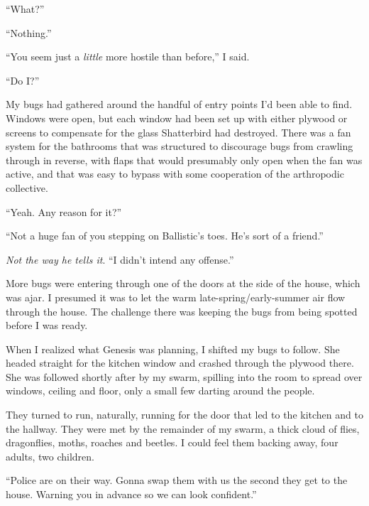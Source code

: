 ``What?''



``Nothing.''



``You seem just a \emph{little} more hostile than before,'' I said.



``Do I?''



My bugs had gathered around the handful of entry points I'd been able to find.  Windows were open, but each window had been set up with either plywood or screens to compensate for the glass Shatterbird had destroyed.  There was a fan system for the bathrooms that was structured to discourage bugs from crawling through in reverse, with flaps that would presumably only open when the fan was active, and that was easy to bypass with some cooperation of the arthropodic collective.



``Yeah.  Any reason for it?''



``Not a huge fan of you stepping on Ballistic's toes.  He's sort of a friend.''



\emph{Not the way he tells it}.  ``I didn't intend any offense.''



More bugs were entering through one of the doors at the side of the house, which was ajar.  I presumed it was to let the warm late-spring/early-summer air flow through the house.  The challenge there was keeping the bugs from being spotted before I was ready.



When I realized what Genesis was planning, I shifted my bugs to follow.  She headed straight for the kitchen window and crashed through the plywood there.  She was followed shortly after by my swarm, spilling into the room to spread over windows, ceiling and floor, only a small few darting around the people.



They turned to run, naturally, running for the door that led to the kitchen and to the hallway.  They were met by the remainder of my swarm, a thick cloud of flies, dragonflies, moths, roaches and beetles.  I could feel them backing away, four adults, two children.



``Police are on their way.  Gonna swap them with us the second they get to the house.  Warning you in advance so we can look confident.''




